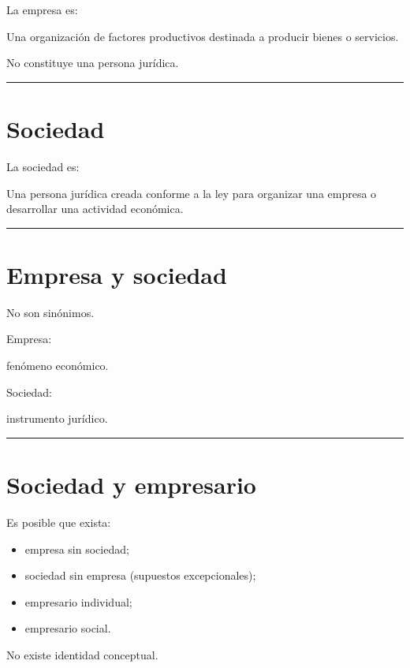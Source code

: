 \documentclass[
  spanish,
  letterpaper,
  DIV=11,
  numbers=noendperiod]{scrartcl}
\providecommand{\tightlist}{%
  \setlength{\itemsep}{0pt}\setlength{\parskip}{0pt}}
\begin{document}
La empresa es:

Una organización de factores productivos destinada a producir bienes o
servicios.

No constituye una persona jurídica.

\begin{center}\rule{0.5\linewidth}{0.5pt}\end{center}

\section{Sociedad}\label{sociedad}

La sociedad es:

Una persona jurídica creada conforme a la ley para organizar una empresa
o desarrollar una actividad económica.

\begin{center}\rule{0.5\linewidth}{0.5pt}\end{center}

\section{Empresa y sociedad}\label{empresa-y-sociedad}

No son sinónimos.

Empresa:

fenómeno económico.

Sociedad:

instrumento jurídico.

\begin{center}\rule{0.5\linewidth}{0.5pt}\end{center}

\section{Sociedad y empresario}\label{sociedad-y-empresario}

Es posible que exista:

\begin{itemize}
\tightlist
\item
  empresa sin sociedad;
\item
  sociedad sin empresa (supuestos excepcionales);
\item
  empresario individual;
\item
  empresario social.
\end{itemize}

No existe identidad conceptual.
\end{document}
